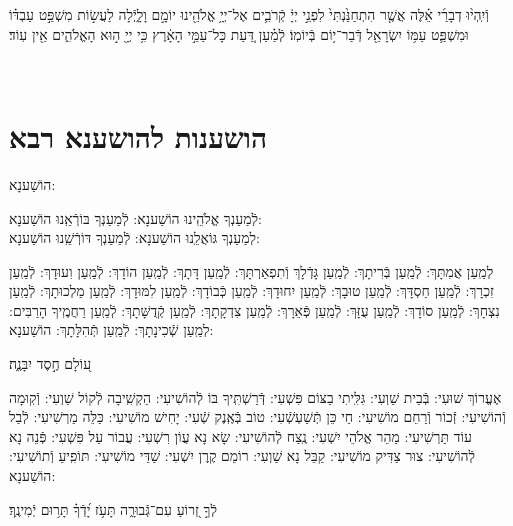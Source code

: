 \documentclass[twoside, openany, parskip=half, 11pt]{book}
\begin{document}
\begin{sometimes}
 וְֿיִֽהְי֨וּ דְבָרַ֜י אֵ֗לֶּה אֲשֶׁ֤ר הִתְחַנַּ֙נְתִּי֙ לִפְנֵ֣י יְיָ֔ קְֿרֹבִ֛ים אֶל־יְיָ֥ אֱלֹהֵ֖ינוּ יוֹמָ֣ם וָלָ֑יְֿלָה לַעֲשׂ֣וֹת מִשְׁפַּ֣ט עַבְדּ֗וֹ וּמִשְׁפַּ֛ט עַמּ֥וֹ יִשְׂרָאֵ֖ל דְּֿבַר־י֥וֹם בְּֿיוֹמֽוֹ׃ לְֿמַ֗עַן דַּ֚עַת כָּל־עַמֵּ֣י הָאָ֔רֶץ כִּ֥י יְיָ֖ ה֣וּא הָאֱלֹהִ֑ים אֵ֖ין עֽוֹד׃

 \vfill
{}\\

\clearpage

\vspace{-1\baselineskip}
\section[הושענות להושענא רבא]{ הושענות להושענא רבא }

\begin{Large}
 הוֹשַׁענָא:
 \end{Large}


 לְֿמַעַנְךָ אֱלֹהֵֽינוּ הוֹשַׁענָא: לְֿמַעַנְךָ בּוֹרְֿאֵֽנוּ הוֹשַׁענָא:\\
לְמַעַנְךָ גּוֹאֲלֵֽנוּ הוֹשַׁענָא: לְֿמַעַנְךָ דּוֹרְֿשֵֽׁנוּ הוֹשַׁענָא:

לְמַֽעַן אֲמִתָּךְ: לְֿמַֽעַן בְּֿרִיתָךְ: לְֿמַֽעַן גָּדְֿלָךְ וְֿתִפְאַרְתָּךְ: לְֿמַֽעַן דָּתָךְ: לְֿמַֽעַן הוֹדָךְ: לְֿמַֽעַן וִעוּדָךְ: לְֿמַֽעַן זִכְרָךְ: לְֿמַֽעַן חַסְדָּךְ: לְֿמַֽעַן טוּבָךְ: לְֿמַֽעַן יִחוּדָךְ: לְֿמַֽעַן כְּֿבוֹדָךְ: לְֿמַֽעַן לִמּוּדָךְ: לְֿמַֽעַן מַלְכוּתָךְ: לְֿמַֽעַן נִצְחָךְ: לְֿמַֽעַן סוֹדָךְ: לְֿמַֽעַן עֻזָּךְ: לְֿמַֽעַן פְּֿאֵרָךְ: לְֿמַֽעַן צִדְקָתָךְ: לְֿמַֽעַן קְֿדֻשָּׁתָךְ: לְֿמַֽעַן רַחֲמֶֽיךָ הָרַבִּים:
לְמַֽעַן שְֿׁכִינָתָךְ:
 לְֿמַֽעַן תְּֿהִלָּתָךְ: הוֹשַׁענָא:

ע֭וֹלָם חֶ֣סֶד יִבָּנֶ֑ה׃

אֶעֱרוֹךְ שׁוּעִי: בְּֿבֵית שַׁוְעִי: גִּלִּֽיתִי בַצּוֹם פִּשְׁעִי: דְּֿרַשְׁתִּֽיךָ בּוֹ לְֿהוֹשִׁיעִי: הַקְשִֽׁיבָה לְֿקוֹל שַׁוְעִי: וְֿקֽוּמָה וְֿהוֹשִׁיעִי: זְֿכוֹר וְֿרַחֵם מוֹשִׁיעִי: חַי כֵּן תְּֿשַׁעְשְֿׁעִי: טוֹב בְּֿאֶֽנֶק שְֿׁעִי: יָחִישׁ מוֹשִׁיעִי: כַּלֵּה מַרְשִׁיעִי: לְֿבַל עוֹד תַּרְשִׁיעִי: מַהֵר אֱלֹהֵי יִשְׁעִי: נֶֽצַח לְֿהוֹשִׁיעִי: שָׂא נָא עֲוֹן רִשְׁעִי: עֲבוֹר עַל פִּשְׁעִי: פְּֿנֵה נָא לְֿהוֹשִׁיעִי: צוּר צַדִּיק מוֹשִׁיעִי: קַבֵּל נָא שַׁוְעִי: רוֹמֵם קֶֽרֶן יִשְׁעִי:
שַׁדַּי מוֹשִׁיעִי:
תּוֹפִֽיעַ וְֿתוֹשִׁיעִי: הוֹשַׁענָא:

 לְֿךָ֣ זְ֭רוֹעַ עִם־גְּֿבוּרָ֑ה תָּעֹ֥ז יָ֝דְֿךָ֗ תָּר֥וּם יְֿמִינֶֽךָ׃



\end{sometimes}
\end{document}
